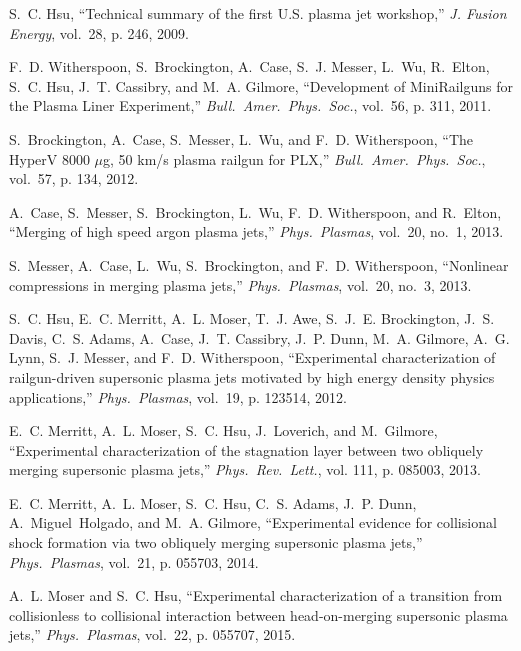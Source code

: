 \documentclass[journal]{IEEEtran}
\begin{document}
\begin{thebibliography}{10}
S.~C. Hsu, ``Technical summary of the first \mbox{U.S.} plasma jet workshop,''
  \emph{J. Fusion Energy}, vol.~28, p. 246, 2009.

F.~D. Witherspoon, S.~Brockington, A.~Case, S.~J. Messer, L.~Wu, R.~Elton,
  S.~C. Hsu, J.~T. Cassibry, and M.~A. Gilmore, ``Development of
  \mbox{M}ini\mbox{R}ailguns for the \mbox{P}lasma \mbox{L}iner
  \mbox{E}xperiment,'' \emph{Bull.\ Amer.\ Phys.\ Soc.}, vol.~56, p. 311, 2011.

S.~Brockington, A.~Case, S.~Messer, L.~Wu, and F.~D. Witherspoon, ``The
  \mbox{HyperV} 8000 $\mu$g, 50 km/s plasma railgun for \mbox{PLX},''
  \emph{Bull.\ Amer.\ Phys.\ Soc.}, vol.~57, p. 134, 2012.

A.~Case, S.~Messer, S.~Brockington, L.~Wu, F.~D. Witherspoon, and R.~Elton,
  ``Merging of high speed argon plasma jets,'' \emph{Phys.\ Plasmas}, vol.~20,
  no.~1, 2013.

S.~Messer, A.~Case, L.~Wu, S.~Brockington, and F.~D. Witherspoon, ``Nonlinear
  compressions in merging plasma jets,'' \emph{Phys.\ Plasmas}, vol.~20, no.~3,
  2013.

S.~C. Hsu, E.~C. Merritt, A.~L. Moser, T.~J. Awe, S.~J.~E. Brockington, J.~S.
  Davis, C.~S. Adams, A.~Case, J.~T. Cassibry, J.~P. Dunn, M.~A. Gilmore, A.~G.
  Lynn, S.~J. Messer, and F.~D. Witherspoon, ``Experimental characterization of
  railgun-driven supersonic plasma jets motivated by high energy density
  physics applications,'' \emph{Phys.\ Plasmas}, vol.~19, p. 123514, 2012.

E.~C. Merritt, A.~L. Moser, S.~C. Hsu, J.~Loverich, and M.~Gilmore,
  ``Experimental characterization of the stagnation layer between two obliquely
  merging supersonic plasma jets,'' \emph{Phys.\ Rev.\ Lett.}, vol. 111, p.
  085003, 2013.

E.~C. Merritt, A.~L. Moser, S.~C. Hsu, C.~S. Adams, J.~P. Dunn,
  A.~Miguel~Holgado, and M.~A. Gilmore, ``Experimental evidence for collisional
  shock formation via two obliquely merging supersonic plasma jets,''
  \emph{Phys.\ Plasmas}, vol.~21, p. 055703, 2014.

A.~L. Moser and S.~C. Hsu, ``Experimental characterization of a transition from
  collisionless to collisional interaction between head-on-merging supersonic
  plasma jets,'' \emph{Phys.\ Plasmas}, vol.~22, p. 055707, 2015.


\end{thebibliography}
\end{document}
